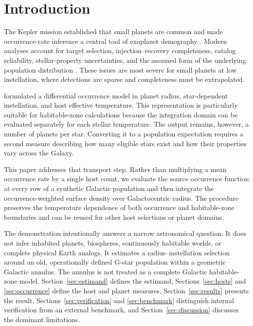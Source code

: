 \documentclass[twocolumn]{aastex631}
\begin{document}

\section{Introduction}\label{sec:intro}

The Kepler mission established that small planets are common and made occurrence-rate inference a central tool of exoplanet demography \citep[e.g.,][]{Howard2012,Fressin2013,Petigura2013}. Modern analyses account for target selection, injection--recovery completeness, catalog reliability, stellar-property uncertainties, and the assumed form of the underlying population distribution \citep{Burke2015,ForemanMackey2014,Kunimoto2020}. These issues are most severe for small planets at low instellation, where detections are sparse and completeness must be extrapolated.

\citet{Bryson2021} formulated a differential occurrence model in planet radius, star-dependent instellation, and host effective temperature. This representation is particularly suitable for habitable-zone calculations because the integration domain can be evaluated separately for each stellar temperature. The output remains, however, a number of planets per star. Converting it to a population expectation requires a second measure describing how many eligible stars exist and how their properties vary across the Galaxy.

This paper addresses that transport step. Rather than multiplying a mean occurrence rate by a single host count, we evaluate the source occurrence function at every row of a synthetic Galactic population and then integrate the occurrence-weighted surface density over Galactocentric radius. The procedure preserves the temperature dependence of both occurrence and habitable-zone boundaries and can be reused for other host selections or planet domains.

The demonstration intentionally answers a narrow astronomical question. It does not infer inhabited planets, biospheres, continuously habitable worlds, or complete physical Earth analogs. It estimates a radius--instellation selection around an old, operationally defined G-star population within a geometric Galactic annulus. The annulus is not treated as a complete Galactic habitable-zone model. Section~\ref{sec:estimand} defines the estimand, Sections~\ref{sec:hosts} and \ref{sec:occurrence} define the host and planet measures, Section~\ref{sec:results} presents the result, Sections~\ref{sec:verification} and \ref{sec:benchmark} distinguish internal verification from an external benchmark, and Section~\ref{sec:discussion} discusses the dominant limitations.
\end{document}
